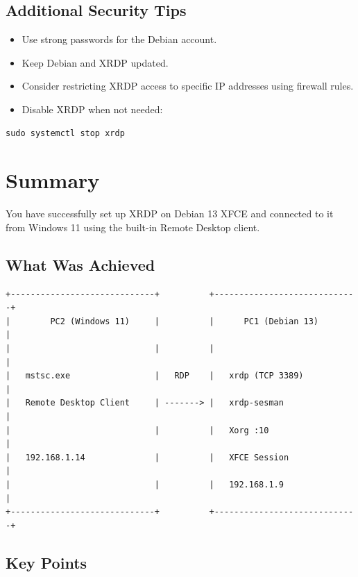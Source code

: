 \documentclass[a4paper,12pt]{article}
\begin{document}
\subsection{Additional Security Tips}

\begin{itemize}[leftmargin=2em]
    \item Use strong passwords for the Debian account.
    \item Keep Debian and XRDP updated.
    \item Consider restricting XRDP access to specific IP addresses using firewall rules.
    \item Disable XRDP when not needed:
\end{itemize}

\begin{lstlisting}[style=bashstyle]
sudo systemctl stop xrdp
\end{lstlisting}

\section{Summary}

You have successfully set up XRDP on Debian 13 XFCE and connected to it from Windows 11 using the built-in Remote Desktop client.

\subsection{What Was Achieved}

\begin{lstlisting}[style=textstyle]
+-----------------------------+          +-----------------------------+
|        PC2 (Windows 11)     |          |      PC1 (Debian 13)        |
|                             |          |                             |
|   mstsc.exe                 |   RDP    |   xrdp (TCP 3389)           |
|   Remote Desktop Client     | -------> |   xrdp-sesman               |
|                             |          |   Xorg :10                  |
|   192.168.1.14              |          |   XFCE Session              |
|                             |          |   192.168.1.9               |
+-----------------------------+          +-----------------------------+
\end{lstlisting}

\subsection{Key Points}
\end{document}
